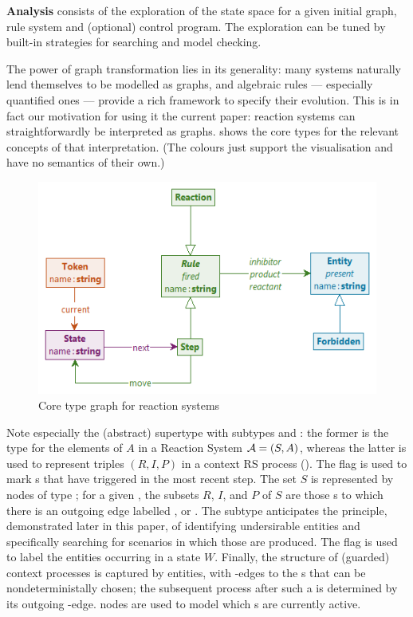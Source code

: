 \textbf{Analysis} consists of the exploration of the state space for a given initial graph, rule system and (optional) control program. The exploration can be tuned by built-in strategies for searching and model checking.

\smallskip\noindent
The power of graph transformation lies in its generality: many systems naturally lend themselves to be modelled as graphs, and algebraic rules --- especially quantified ones --- provide a rich framework to specify their evolution. This is in fact our motivation for using it the current paper: reaction systems can straightforwardly be interpreted as graphs.  shows the core types for the relevant concepts of that interpretation. (The colours just support the visualisation and have no semantics of their own.)

\begin{figure}
\centering
\includegraphics[scale=.5]{figs/core-type}
\caption{Core type graph for reaction systems}
\label{fig:core-type}
\end{figure}
%
Note especially the (abstract) supertype \Rule with subtypes \Reaction and \Step: the former is the type for the elements of $A$ in a Reaction System ${\cal A}=(S,A)$, whereas the latter is used to represent triples $(R,I,P)$ in a context RS process (). The flag \fired is used to mark \Rule{}s that have triggered in the most recent step. The set $S$ is represented by nodes of type \Entity; for a given \Rule, the subsets $R$, $I$, and $P$ of $S$ are those \Entity{}s to which there is an outgoing edge labelled \reactant, \inhibitor or \product. The subtype \Forbidden anticipates the principle, demonstrated later in this paper, of identifying undersirable entities and specifically searching for scenarios in which those are produced. The flag \present is used to label the entities occurring in a state $W$. Finally, the structure of (guarded) context processes is captured by \State entities, with \nextt-edges to the \Step{}s that can be nondeterministally chosen; the subsequent process after such a \Step is determined by its outgoing \move-edge. \Token nodes are used to model which \State{}s are currently active.

